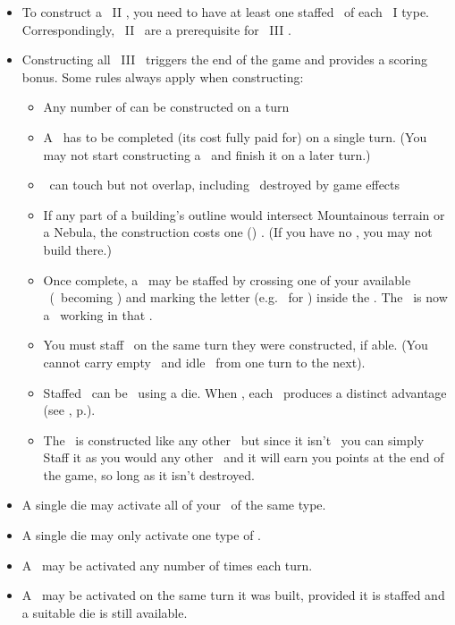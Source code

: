 \begin{itemize}
	\item To construct a \level\ II \fortification, you need to have at least one staffed \fortification\ of each \level\ I type. Correspondingly, \level\ II \fortifications\ are a prerequisite for \level\ III \fortifications.
	\item Constructing all \level\ III \fortifications\ triggers the end of the game and provides a scoring bonus.  Some rules always apply when constructing:
  \begin{itemize}
    \item Any number of \fortifications can be constructed on a turn
    \item A \fortification\ has to be completed (its cost fully paid for) on a single turn. (You may not start constructing a \fortification\ and finish it on a later turn.)
    \item \fortifications\ can touch but not overlap, including \fortifications\ destroyed by game effects
    \item If any part of a building’s outline would intersect Mountainous terrain or a Nebula, the construction costs one (\spendcurrency) \currency. (If you have no \currency, you may not build there.)
    \item Once complete, a \fortification\ may be staffed by crossing one of your available \astronauts\ (\gainastronautsymbol\ becoming \useastronautsymbol) and marking the letter (e.g. \academysymbol\ for \academy) inside the \fortification. The \astronaut\ is now a \specialist\ working in that \fortification.
    \item You must staff \fortifications\ on the same turn they were constructed, if able. (You cannot carry empty \fortifications\ and idle \astronauts\ from one turn to the next).
		\item Staffed \fortifications\ can be \activated\ using a die.  When \activated, each \fortification\ produces a distinct advantage (see , p.\pageref{sec:fortifications}).
	  \item The \spacestation\ is constructed like any other \fortification\ but since it isn't \activated\ you can simply Staff it as you would any other \fortification\ and it will earn you points at the end of the game, so long as it isn't destroyed.
  \end{itemize}
  \item A single die may activate all of your \fortifications\ of the same type.
  \item A single die may only activate one type of \fortification.
  \item A \fortification\ may be activated any number of times each turn.
  \item A \fortification\ may be activated on the same turn it was built, provided it is staffed and a suitable die is still available.
\end{itemize}
